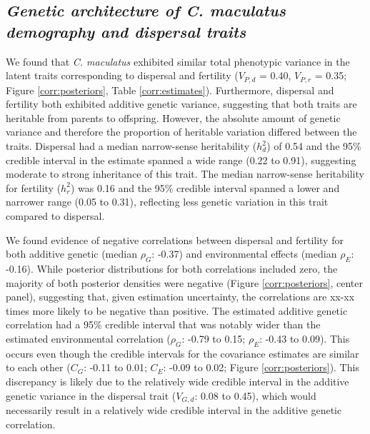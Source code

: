 \subsection{\textit{Genetic architecture of \textup{C. maculatus} demography and dispersal traits}}

We found that \textit{C. maculatus} exhibited similar total phenotypic variance in the latent traits corresponding to dispersal and fertility ($V_{P,d}$  = 0.40, $V_{P,r}$  = 0.35; Figure \ref{corr:posteriors}, Table \ref{corr:estimates}). Furthermore, dispersal and fertility both exhibited additive genetic variance, suggesting that both traits are heritable from parents to offspring. However, the absolute amount of genetic variance and therefore the proportion of heritable variation differed between the traits. Dispersal had a median narrow-sense heritability ($h^{2}_{d}$) of 0.54 and the 95\% credible interval in the estimate spanned a wide range (0.22 to 0.91), suggesting moderate to strong inheritance of this trait. The median narrow-sense heritability for fertility ($h^{2}_{r}$) was 0.16 and the 95\% credible interval spanned a lower and narrower range (0.05 to 0.31), reflecting less genetic variation in this trait compared to dispersal.

We found evidence of negative correlations between dispersal and fertility for both additive genetic (median $\rho_{G}$: -0.37) and environmental effects (median $\rho_{E}$: -0.16). While posterior distributions for both correlations included zero, the majority of both posterior densities were negative (Figure \ref{corr:posteriors}, center panel), suggesting that, given estimation uncertainty, the correlations are xx-xx times more likely to be negative than positive. The estimated additive genetic correlation had a 95\% credible interval that was notably wider than the estimated environmental correlation ($\rho_{G}$: -0.79 to 0.15; $\rho_{E}$: -0.43 to 0.09). This occurs even though the credible intervals for the covariance estimates are similar to each other ($C_{G}$: -0.11 to 0.01; $C_{E}$: -0.09 to 0.02; Figure \ref{corr:posteriors}). This discrepancy is likely due to the relatively wide credible interval in the additive genetic variance in the dispersal trait ($V_{G,d}$: 0.08 to 0.45), which would necessarily result in a relatively wide credible interval in the additive genetic correlation.

